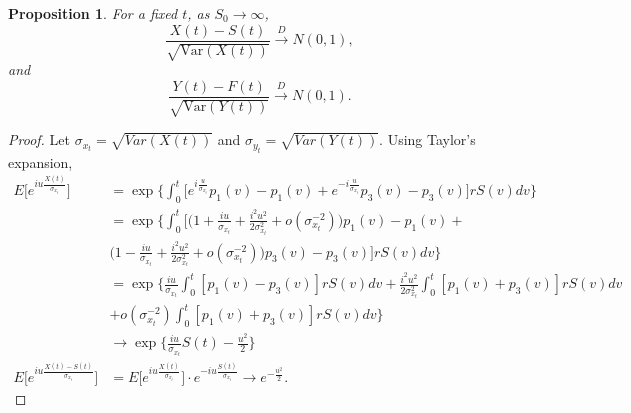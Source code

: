 \documentclass[12pt]{article}
\newtheorem{proposition}{Proposition}
\begin{document}
\begin{proposition}
For a fixed $t$, as $S_0 \rightarrow \infty$,
\begin{equation}
\frac{X(t) - S(t)}{\sqrt{\text{Var}(X(t))}} \overset{D}{\to} N(0, 1),
\end{equation}
and 
\begin{equation}
\frac{Y(t) - F(t)}{\sqrt{\text{Var}(Y(t))}} \overset{D}{\to} N(0, 1).
\end{equation}
\end{proposition}
\begin{proof}
Let $\sigma_{x_t} = \sqrt{Var(X(t))}$ and $\sigma_{y_t} = \sqrt{Var(Y(t))}$. Using Taylor's expansion,
\begin{equation}
\begin{split}
E \Big[e^{iu \frac{X(t)}{\sigma_{x_t}}} \Big] &= \exp \Big\{  \int_0^t \Big[ e^{i \frac{u}{\sigma_{x_t}}}p_1(v) - p_1(v) + e^{-i \frac{u}{\sigma_{x_t}}}p_3(v) - p_3(v)\Big] r S(v) dv\Big\} \\
& = \exp \Big\{ \int_0^t \Big[ \Big( 1 + \frac{iu}{\sigma_{x_t}} + \frac{i^2 u^2}{2 \sigma^2_{x_t}} + o(\sigma^{-2}_{x_t}) \Big) p_1(v) - p_1(v)+ \\
& \Big( 1 - \frac{iu}{\sigma_{x_t}} + \frac{i^2 u^2}{2 \sigma^2_{x_t}} + o(\sigma^{-2}_{x_t}) \Big) p_3(v) - p_3(v)  \Big] r S(v) dv\Big\} \\
& = \exp \Big\{ \frac{iu}{\sigma_{x_t}} \int_0^t  [p_1(v) - p_3(v)] r S(v) dv + \frac{i^2u^2}{2\sigma^2_{x_t}}\int_0^t  [p_1(v) + p_3(v)] r S(v) dv \\
& +  o (\sigma^{-2}_{x_t})\int_0^t [p_1(v) + p_3(v)] r S(v) dv \Big\} \\
& \rightarrow \exp \Big\{\frac{iu}{\sigma_{x_t}} S(t)  - \frac{u^2}{2} \Big\} \\
E \Big[ e^{iu \frac{X(t)-S(t)} {\sigma_{x_t}}} \Big] & = E \Big[e^{iu \frac{X(t)}{\sigma_{x_t}}} \Big] \cdot e^{-iu \frac{S(t)}{\sigma_{x_t}}} \rightarrow e^{- \frac{u^2}{2 }}.
\end{split}
\end{equation}


\end{proof}
\end{document}
